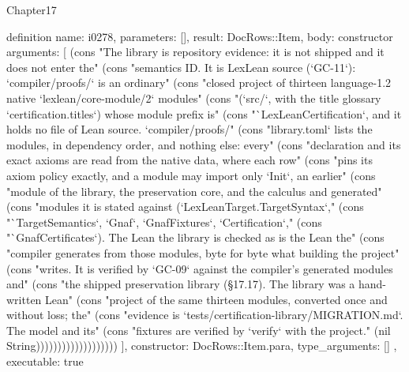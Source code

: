 \begin{lexlean}{Chapter17}
\begin{semanticmodule}
definition{
  name: i0278,
  parameters: [],
  result: DocRows::Item,
  body: constructor{
    arguments: [
      (cons "The library is repository evidence: it is not shipped and it does not enter the" (cons "semantics ID. It is LexLean source (`GC-11`): `compiler/proofs/` is an ordinary" (cons "closed project of thirteen language-1.2 native `lexlean/core-module/2` modules" (cons "(`src/`, with the title glossary `certification.titles`) whose module prefix is" (cons "`LexLeanCertification`, and it holds no file of Lean source. `compiler/proofs/" (cons "library.toml` lists the modules, in dependency order, and nothing else: every" (cons "declaration and its exact axioms are read from the native data, where each row" (cons "pins its axiom policy exactly, and a module may import only `Init`, an earlier" (cons "module of the library, the preservation core, and the calculus and generated" (cons "modules it is stated against (`LexLeanTarget.TargetSyntax`," (cons "`TargetSemantics`, `Gnaf`, `GnafFixtures`, `Certification`," (cons "`GnafCertificates`). The Lean the library is checked as is the Lean the" (cons "compiler generates from those modules, byte for byte what building the project" (cons "writes. It is verified by `GC-09` against the compiler's generated modules and" (cons "the shipped preservation library (§17.17). The library was a hand-written Lean" (cons "project of the same thirteen modules, converted once and without loss; the" (cons "evidence is `tests/certification-library/MIGRATION.md`. The model and its" (cons "fixtures are verified by `verify` with the project." (nil String)))))))))))))))))))
    ],
    constructor: DocRows::Item.para,
    type_arguments: []
  },
  executable: true
}


\end{semanticmodule}
\end{lexlean}
